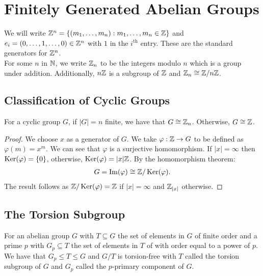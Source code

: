\section{Finitely Generated Abelian Groups}

We will write $\mathbb{Z}^n = \{(m_1, \ldots, m_n) : m_1, \ldots, m_n \in \mathbb{Z}\}$
and $e_i = (0, \ldots, 1, \ldots, 0) \in \mathbb{Z}^n$ with $1$ in the 
$i^{\text{th}}$ entry. These are the standard generators for $\mathbb{Z}^n$.
\\[\baselineskip]
For some $n$ in $\mathbb{N}$, we write $\mathbb{Z}_n$ to be the integers
modulo $n$ which is a group under addition. Additionally, $n\mathbb{Z}$
is a subgroup of $\mathbb{Z}$ and $\mathbb{Z}_n \cong \mathbb{Z}/n\mathbb{Z}$.

\subsection{Classification of Cyclic Groups}

For a cyclic group $G$, if $|G| = n$ finite, we have that $G \cong \mathbb{Z}_n$.
Otherwise, $G \cong \mathbb{Z}$.

\begin{proof}
    We choose $x$ as a generator of $G$. We take $\varphi : \mathbb{Z} \to G$
    to be defined as $\varphi(m) = x^m$. We can see that $\varphi$ is a
    surjective homomorphism. If $|x| = \infty$ then $\operatorname{Ker}(\varphi) = \{0\}$,
    otherwise, $\operatorname{Ker}(\varphi) = |x|\mathbb{Z}$. By the homomorphism theorem:
    \begin{align*}
        G = \operatorname{Im}(\varphi) \cong \mathbb{Z}/\operatorname{Ker}(\varphi).
    \end{align*} The result follows as $\mathbb{Z}/\operatorname{Ker}(\varphi) = \mathbb{Z}$
    if $|x| = \infty$ and $\mathbb{Z}_{|x|}$ otherwise.
\end{proof}

\subsection{The Torsion Subgroup}

For an abelian group $G$ with $T \subseteq G$ the set of
elements in $G$ of finite order and a prime $p$ with
$G_p \subseteq T$ the set of elements in $T$ of with order
equal to a power of $p$. We have that $G_p \leq T \leq G$
and $G/T$ is torsion-free
with $T$ called the torsion subgroup of $G$ and $G_p$ called
the $p$-primary component of $G$.

